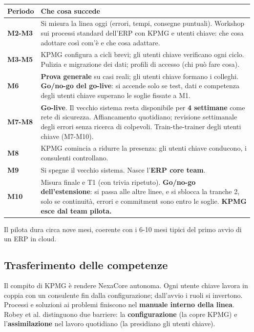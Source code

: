 \documentclass[11pt,a4paper]{article}
\begin{document}
{\small\renewcommand{\arraystretch}{1.25}
\begin{xltabular}{\linewidth}{@{}>{\raggedright\arraybackslash{}\hsize\hspace{0pt}}X>{\raggedright\arraybackslash{}\hsize\hspace{0pt}}X@{}}
\toprule
\textbf{Periodo} & \textbf{Che cosa succede} \\
\midrule
\endhead
\textbf{M2-M3} & Si misura la linea oggi (errori, tempi, consegne puntuali). Workshop sui processi standard dell'ERP con KPMG e utenti chiave: che cosa adottare così com'è e che cosa adattare. \\
\textbf{M3-M5} & KPMG configura a cicli brevi; gli utenti chiave verificano ogni ciclo. Pulizia e migrazione dei dati; profili di accesso (chi può fare cosa). \\
\textbf{M6} & \textbf{Prova generale} su casi reali; gli utenti chiave formano i colleghi. \textbf{Go/no-go del go-live}: si accende solo se test, dati e competenza degli utenti chiave superano le soglie fissate a M1. \\
\textbf{M7-M8} & \textbf{Go-live}. Il vecchio sistema resta disponibile per \textbf{4 settimane} come rete di sicurezza. Affiancamento quotidiano; revisione settimanale degli errori senza ricerca di colpevoli. Train-the-trainer degli utenti chiave (M7-M10). \\
\textbf{M8} & KPMG comincia a ridurre la presenza: gli utenti chiave conducono, i consulenti controllano. \\
\textbf{M9} & Si spegne il vecchio sistema. Nasce l'\textbf{ERP core team}. \\
\textbf{M10} & Misura finale e T1 (con trivia ripetuto). \textbf{Go/no-go dell'estensione}: si passa alle altre linee, e si sblocca la tranche 2, solo se continuità, errori e commitment sono entro le soglie. \textbf{KPMG esce dal team pilota.} \\
\bottomrule
\end{xltabular}}

Il pilota dura circa nove mesi, coerente con i 6-10 mesi tipici del primo avvio di un ERP in cloud.

\subsection{Trasferimento delle competenze}\label{sec:9.5}
Il compito di KPMG è rendere NexaCore autonoma. Ogni utente chiave lavora in coppia con un consulente fin dalla configurazione; dall'avvio i ruoli si invertono. Processi e soluzioni ai problemi finiscono nel \textbf{manuale interno della linea}. Robey et al. distinguono due barriere: la \textbf{configurazione} (la copre KPMG) e l'\textbf{assimilazione} nel lavoro quotidiano (la presidiano gli utenti chiave).
\end{document}
